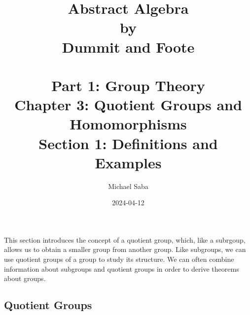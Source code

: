 \documentclass[12pt]{article}
\title{%
    \Huge Abstract Algebra \\
    \large by \\
    \Large Dummit and Foote \\~\\
    \huge Part 1: Group Theory \\
    \LARGE Chapter 3: Quotient Groups and Homomorphisms \\
    \Large Section 1: Definitions and Examples
}
\date{2024-04-12}
\author{Michael Saba}
\begin{document}
    \maketitle
    \newpage
 
    This section introduces the concept of a quotient group,
    which, like a subrgoup, allows us to obtain a smaller group
    from another group. 
    Like subgroups, we can use quotient groups of a group to study
    its structure.
    We can often combine information about subgroups and quotient
    groups in order to derive theorems about groups. \\

    \subsection*{Quotient Groups}
\end{document}
